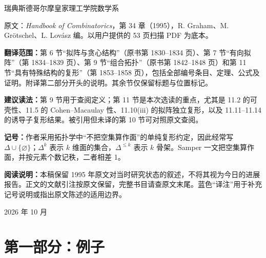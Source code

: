 \def\shorttitle{Björner：拓扑方法，第 6、7、9、11 节}

\begin{titlepage}\centering
\vspace*{22mm}{\Huge 拓扑方法\par}\vspace{6mm}{\Large Topological Methods\par}
\vspace{10mm}{\Large Anders Björner\par}\vspace{4mm}瑞典斯德哥尔摩皇家理工学院数学系\par
\vspace{12mm}{\Large 第 6、7、9、11 节中文选译\par}
\vspace{10mm}\begin{minipage}{.87\textwidth}
原文：\emph{Handbook of Combinatorics}，第 34 章（1995），R. Graham、M. Grötschel、L. Lovász 编。以用户提供的 53 页扫描 PDF 为底本。

\textbf{翻译范围：}第 6 节“拟阵与贪心结构”（原书第 1830--1834 页）、第 7 节“有向拟阵”（第 1834--1839 页）、第 9 节“组合拓扑”（原书第 1842--1848 页）和第 11 节“具有特殊结构的复形”（第 1853--1858 页），包括全部编号条目、定理、公式及证明。附译第二部分开头的说明。其余节仅保留标题与位置标记。

\textbf{建议读法：}第 9 节用于查阅定义；第 11 节是本次选读的重点，尤其是 11.2 的可壳性、11.5 的 Cohen--Macaulay 性、11.10(iii) 的拟阵独立复形，以及 11.11--11.14 的诱导子复形结果。被引用但未译的第 10 节可对照原文查阅。

\textbf{记号：}作者采用拓扑学中“不把空集算作面”的单纯复形约定，因此经常写 $\Delta\cup\{\varnothing\}$；$\Delta^k$ 表示 $k$ 维面的集合，$\Delta^{\le k}$ 表示 $k$ 骨架。Samper 一文把空集算作面，并按元素个数记秩，二者相差 1。

\textbf{阅读说明：}本稿保留 1995 年原文对当时研究状态的叙述，不将其视为今日的进展报告。正文的文献引注按原文保留，完整书目请查原文末尾。蓝色“译注”用于补充记号说明或指出原文陈述的适用边界。
\end{minipage}\vfill 2026 年 10 月\par
\end{titlepage}
\tableofcontents\newpage
{}
\section*{第一部分：例子}


\clearpage
